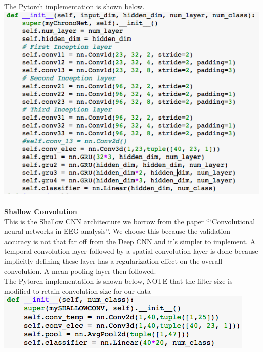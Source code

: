 \documentclass[10pt,twocolumn,letterpaper]{article}
\begin{document}
The Pytorch implementation is shown below. \\
\includegraphics[scale=0.45]{stru_ChronoNet} \\ \\
\textbf{Shallow Convolution} \\
This is the Shallow CNN architecture we borrow from the paper ```Convolutional neural networks in EEG analysis''. We choose this because the validation accuracy is not that far off from the Deep CNN and it's simpler to implement. A temporal convolution layer followed by a spatial convolution layer is done because implicitly defining these layer has a regularization effect on the overall convolution. A mean pooling layer then followed. \cite{CNN} \\ 
The Pytorch implementation is shown below, NOTE that the filter size is modified to retain convolution size for our data \\
\includegraphics[scale=0.5]{stru_SHALLOW} \\ \\
\end{document}
